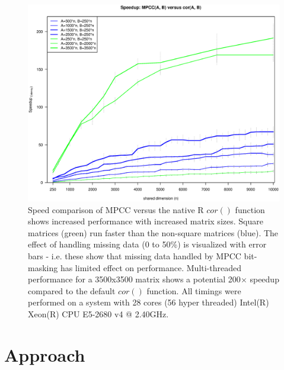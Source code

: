 \documentclass{bioinfo}
\begin{document}
\begin{figure}[H]
\centering
\includegraphics[width=\linewidth]{img/figure02new.eps}
  \caption{ \small Speed comparison of MPCC versus the native R $cor()$
  function shows increased performance with increased matrix
  sizes. Square matrices (green) run faster than the non-square
  matrices (blue).  The effect of handling missing data (0 to 50\%) is
  visualized with error bars - i.e. these show that missing data
  handled by MPCC bit-masking has limited effect on performance.
  Multi-threaded performance for a 3500x3500 matrix shows a potential
  200$\times$ speedup compared to the default $cor()$ function.  All
  timings were performed on a system with 28 cores (56 hyper threaded)
  Intel(R) Xeon(R) CPU E5-2680 v4 @ 2.40GHz.  } \label{fig:fig2}
\end{figure}

\vspace*{-10mm}


\section{Approach}
\end{document}
